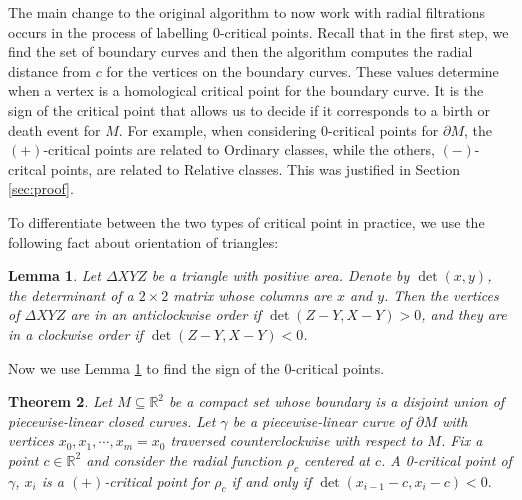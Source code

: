\documentclass[a4paper,11pt]{article}
\newtheorem{theorem}{Theorem}[section]
\newtheorem{lemma}[theorem]{Lemma}
\theoremstyle{definition}
\begin{document}
The main change to the original algorithm to now work with radial filtrations occurs in the process of labelling $0$-critical points. 
Recall that in the first step, we find the set of boundary curves and then the algorithm computes
the radial distance from $c$ for the vertices on the boundary curves. 
These values determine when a vertex is a homological critical point for the boundary curve. 
It is the sign of the critical point that allows us to decide if it corresponds to a birth or death event for $M$. 
For example, when considering $0$-critical points for $\partial M$, the $(+)$-critical points are related to Ordinary classes, while the others, $(-)$-critcal points, are related to Relative classes. This was justified in Section \ref{sec:proof}.

To differentiate between the two types of critical point in practice, we use the following fact about orientation of triangles:

\begin{lemma}\label{triangle}
Let $\Delta XYZ$ be a triangle with positive area. Denote by $\det(x,y)$, 
the determinant of a $2\times 2$ matrix whose columns are $x$ and $y$. 
Then the vertices of $\Delta XYZ$ are in an anticlockwise order if $\det(Z-Y,X-Y)>0$, and they are in a clockwise order if $\det(Z-Y,X-Y)<0$.
\end{lemma}

Now we use Lemma \ref{triangle} to find the sign of the $0$-critical points.

\begin{theorem}\label{localMinTest}
Let $M\subseteq\mathbb{R}^2$ be a compact set whose boundary is a disjoint union of piecewise-linear closed curves. Let $\gamma$ be a piecewise-linear curve of $\partial M$ with vertices $x_0,x_1,\cdots,x_m=x_0$ traversed counterclockwise with respect to $M$.  
Fix a point $c\in\mathbb{R}^2$ and consider the radial function $\rho_c$ centered at $c$. 
A 0-critical point of $\gamma$, $x_i$ is a $(+)$-critical point for $\rho_c$ if and only if $\det(x_{i-1}-c,x_i-c)<0.$
\end{theorem}
\end{document}
